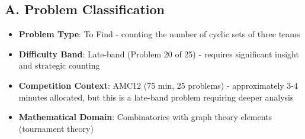 \documentclass[]{article}
\begin{document}
\begin{problemconfigbox}
\subsection*{A. Problem Classification}
\begin{itemize}[leftmargin=*]
    \item \textbf{Problem Type}: To Find - counting the number of cyclic sets of three teams
    \item \textbf{Difficulty Band}: Late-band (Problem 20 of 25) - requires significant insight and strategic counting
    \item \textbf{Competition Context}: AMC12 (75 min, 25 problems) - approximately 3-4 minutes allocated, but this is a late-band problem requiring deeper analysis
    \item \textbf{Mathematical Domain}: Combinatorics with graph theory elements (tournament theory)
\end{itemize}


\end{problemconfigbox}
\end{document}
